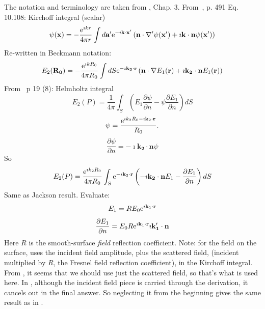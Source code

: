 \documentclass[11pt,openany]{report}
\newcommand{\pder}[2]{\frac{\partial {#1}}{\partial {#2}}}
\newcommand{\e}{{\rm e}}
\newcommand{\bm}[1]{\mathbf{#1}}
\begin{document}
{{The notation and terminology are taken from \cite{b:beckmann},
Chap. 3.
From~\cite{b:jackson}, p. 491 Eq. 10.108:
Kirchoff integral (scalar)
  \begin{equation}
\psi(\bm{x})=-\frac{\e^{\imath k r}}{4\pi r}
\int d\bm{a'}\e^{-\imath\bm{k}\cdot\bm{x'}}
\left(\bm{n}\cdot\nabla'\psi(\bm{x'})+\imath\bm{k}\cdot\bm{n}\psi(\bm{x'})\right)
  \end{equation}
Re-written in Beckmann notation:
  \begin{equation}
E_{2}(\bm{\bm{R_{0}}})=
-\frac{\e^{\imath k R_{0}}}{4\pi R_{0}}
\int dS\e^{-\imath\bm{k_{2}}\cdot\bm{r}}\left(\bm{n}\cdot\nabla E_{1}(\bm{r})+
\imath\bm{k_{2}}\cdot\bm{n}E_{1}(\bm{r})\right)
  \end{equation}
From~\cite{b:beckmann} p 19 (8): Helmholtz integral
  \begin{equation}
E_{2}(P)=\frac{1}{4\pi}\int_{S}\left(E_{1}\pder{\psi}{n}-\psi\pder{E_{1}}{n}\right)dS
  \end{equation}
  \begin{equation}
\psi=\frac{\e^{\imath k_{2}R_{0}-\imath\bm{k}_{2}\cdot\bm{r}}}{R_{0}}.
  \end{equation}
  \begin{equation}
\pder{\psi}{n}=-\imath\bm{k_{2}}\cdot\bm{n}\psi
  \end{equation}
So
  \begin{equation}
E_{2}(P)=\frac{\e^{\imath k_{2}R_{0}}}{4\pi R_{0}}
\int_{S}\e^{-\imath\bm{k}_{2}\cdot\bm{r}}\left(-\imath\bm{k_{2}}\cdot\bm{n}E_{1}-\pder{E_{1}}{n}\right)dS
  \end{equation}
Same as Jackson result. Evaluate:
  \begin{equation}
E_{1}=RE_{0}\e^{\imath\bm{k}_{1}\cdot\bm{r}}
  \end{equation}
  \begin{equation}
\pder{E_{1}}{n}=E_{0}R\e^{\imath\bm{k}_{1}\cdot\bm{r}}\imath\bm{k'_{1}}\cdot\bm{n}
  \end{equation}
Here $R$ is the smooth-surface \emph{field} reflection
coefficient. Note: for the field on the surface, \cite{b:beckmann} uses the
incident field amplitude, plus the scattered field, (incident
multiplied by $R$, the Fresnel field reflection coefficient), in the
Kirchoff integral.  From \cite{b:jackson}, it seems that we should use just
the scattered field, so that's what is used here. In \cite{b:beckmann} ,
although the incident field piece is carried through the derivation,
it cancels out in the final answer. So neglecting it from the
beginning gives the same result as in \cite{b:beckmann}.

}}
\end{document}
